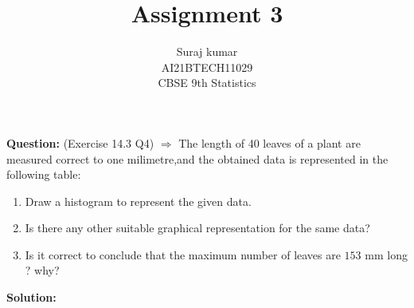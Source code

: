 \documentclass[12pt,twocolumn]{IEEEtran}
\title{Assignment 3}
\author{Suraj kumar \\ \normalsize AI21BTECH11029\\ \Large CBSE 9th Statistics }
\newcommand{\question}{\noindent \textbf{Question: }}
\newcommand{\solution}{\noindent \textbf{Solution: }}
\begin{document}
\maketitle
\question  (Exercise 14.3 Q4) $\Rightarrow$ The length of 40 leaves of a plant are measured correct to one milimetre,and the obtained data is represented in the following table:
\begin{table}[ht!]
	\begin{center}
		
		\vspace*{3pt}
		\caption{}
		\label{table:table1}
	\end{center}
\end{table}
\begin{enumerate}[label=(\roman*)]
	\item Draw a histogram to represent the given data.
	\item Is there any other suitable graphical representation for the same data?
	\item Is it correct to conclude that the maximum number of leaves are $153$ mm long ? why?
\end{enumerate}
\solution
\end{document}

